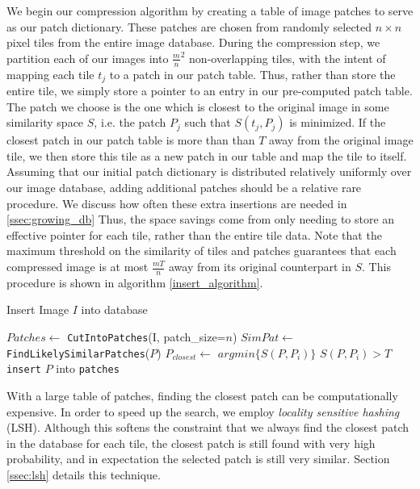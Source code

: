 We begin our compression algorithm by creating a table of image patches to serve as our patch dictionary.  These patches are chosen from randomly selected $n \times n$ pixel tiles from the entire image database.   During the compression step, we partition each of our images into $\frac{m}{n}^2$ non-overlapping tiles, with the intent of mapping each tile $t_j$ to a patch in our patch table.  Thus, rather  than store the entire tile, we simply store a pointer to an entry in our pre-computed patch table.  The patch we choose is the one which is closest to the original image in some similarity space $S$, i.e. the patch $P_j$ such that $S(t_j, P_j)$ is minimized.  If the closest patch in our patch table is more than than $T$ away from the original image tile, we then store this tile as a new patch in our table and map the tile to itself.  Assuming that our initial patch dictionary is distributed relatively uniformly over our image database, adding additional patches should be a relative rare procedure.  We discuss how often these extra insertions are needed in \ref{ssec:growing_db} Thus, the space savings come from only needing to store an effective pointer for each tile, rather than the entire tile data.  Note that the maximum threshold on the similarity of tiles and patches guarantees that each compressed image is at most $\frac{mT}{n}$ away from its original counterpart in $S$.  This procedure is shown in algorithm \ref{insert_algorithm}.

\begin{algorithm}
    \caption{Insert Image $I$ into database}
    \label{alg:insert}
\begin{algorithmic}[1]
\State $Patches \leftarrow $ \texttt{CutIntoPatches}(I, patch\_size=$n$)
\State $SimPat \leftarrow $\texttt{FindLikelySimilarPatches}($P$)
\State $P_{closest} \leftarrow $ $argmin \{ S(P, P_i) \}$
\If $S(P, P_i) > T$
\State \texttt{insert} $P$ into \texttt{patches}
\EndIf
\EndFor
\vspace{3mm}
\end{algorithmic}
\label{insert_algorithm}
\end{algorithm}

With a large table of patches, finding the closest patch can be computationally expensive.  In order to speed up the search, we employ \emph{locality sensitive hashing} (LSH).  Although this softens the constraint that we always find the closest patch in the database for each tile, the closest patch is still found with very high probability, and in expectation the selected patch is still very similar.  Section \ref{ssec:lsh} details this technique.

